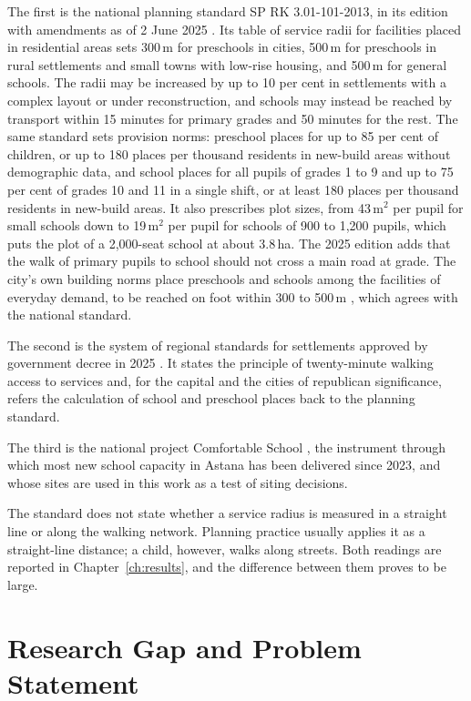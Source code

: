 The first is the national planning standard SP RK 3.01-101-2013, in its edition with amendments as of 2 June 2025 \cite{sprk2013}. Its table of service radii for facilities placed in residential areas sets 300\,m for preschools in cities, 500\,m for preschools in rural settlements and small towns with low-rise housing, and 500\,m for general schools. The radii may be increased by up to 10 per cent in settlements with a complex layout or under reconstruction, and schools may instead be reached by transport within 15 minutes for primary grades and 50 minutes for the rest. The same standard sets provision norms: preschool places for up to 85 per cent of children, or up to 180 places per thousand residents in new-build areas without demographic data, and school places for all pupils of grades 1 to 9 and up to 75 per cent of grades 10 and 11 in a single shift, or at least 180 places per thousand residents in new-build areas. It also prescribes plot sizes, from 43\,m$^2$ per pupil for small schools down to 19\,m$^2$ per pupil for schools of 900 to 1,200 pupils, which puts the plot of a 2,000-seat school at about 3.8\,ha. The 2025 edition adds that the walk of primary pupils to school should not cross a main road at grade. The city's own building norms place preschools and schools among the facilities of everyday demand, to be reached on foot within 300 to 500\,m \cite{snipastana2007}, which agrees with the national standard.

The second is the system of regional standards for settlements approved by government decree in 2025 \cite{decree7102025}. It states the principle of twenty-minute walking access to services and, for the capital and the cities of republican significance, refers the calculation of school and preschool places back to the planning standard.

The third is the national project Comfortable School \cite{comfortschool2022}, the instrument through which most new school capacity in Astana has been delivered since 2023, and whose sites are used in this work as a test of siting decisions.

The standard does not state whether a service radius is measured in a straight line or along the walking network. Planning practice usually applies it as a straight-line distance; a child, however, walks along streets. Both readings are reported in Chapter~\ref{ch:results}, and the difference between them proves to be large.

\section{Research Gap and Problem Statement}
\label{sec:gap}

